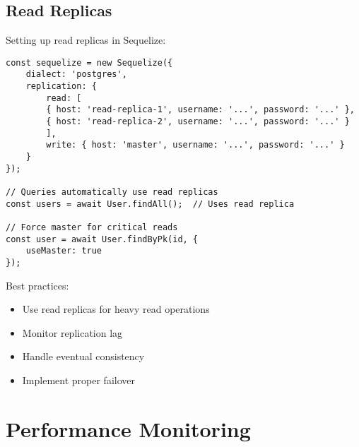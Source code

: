 \documentclass[12pt,a4paper]{book}
\begin{document}
	\subsection{Read Replicas}
	\begin{tcolorbox}[title=Configuring Read Replicas]
		Setting up read replicas in Sequelize:
		
		\begin{verbatim}
const sequelize = new Sequelize({
	dialect: 'postgres',
	replication: {
		read: [
		{ host: 'read-replica-1', username: '...', password: '...' },
		{ host: 'read-replica-2', username: '...', password: '...' }
		],
		write: { host: 'master', username: '...', password: '...' }
	}
});

// Queries automatically use read replicas
const users = await User.findAll();  // Uses read replica

// Force master for critical reads
const user = await User.findByPk(id, {
	useMaster: true
});
		\end{verbatim}
		
		Best practices:
		\begin{itemize}
			\item Use read replicas for heavy read operations
			\item Monitor replication lag
			\item Handle eventual consistency
			\item Implement proper failover
		\end{itemize}
	\end{tcolorbox}
	
	\section{Performance Monitoring}
	
\end{document}
